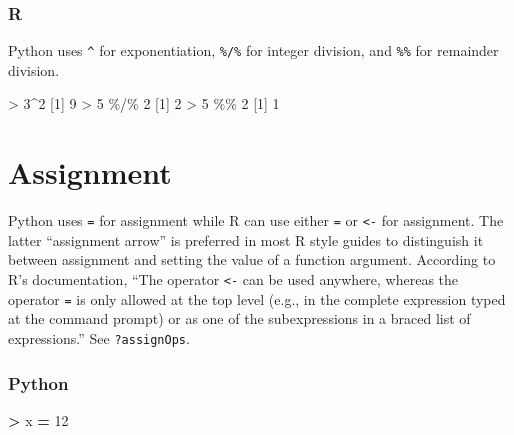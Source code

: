 \documentclass[
]{book}
\newenvironment{Shaded}{\begin{snugshade}}{\end{snugshade}}
\newcommand{\DecValTok}[1]{\textcolor[rgb]{0.00,0.00,0.81}{#1}}
\newcommand{\NormalTok}[1]{#1}
\newcommand{\OperatorTok}[1]{\textcolor[rgb]{0.81,0.36,0.00}{\textbf{#1}}}
\newcommand{\SpecialCharTok}[1]{\textcolor[rgb]{0.00,0.00,0.00}{#1}}
\begin{document}
\hypertarget{r}{%
\subsubsection*{R}\label{r}}

Python uses \texttt{\^{}} for exponentiation, \texttt{\%/\%} for integer division, and \texttt{\%\%} for remainder division.

\begin{Shaded}
\begin{Highlighting}[]
\SpecialCharTok{\textgreater{}} \DecValTok{3}\SpecialCharTok{\^{}}\DecValTok{2}
\NormalTok{[}\DecValTok{1}\NormalTok{] }\DecValTok{9}
\SpecialCharTok{\textgreater{}} \DecValTok{5} \SpecialCharTok{\%/\%} \DecValTok{2}
\NormalTok{[}\DecValTok{1}\NormalTok{] }\DecValTok{2}
\SpecialCharTok{\textgreater{}} \DecValTok{5} \SpecialCharTok{\%\%} \DecValTok{2}
\NormalTok{[}\DecValTok{1}\NormalTok{] }\DecValTok{1}
\end{Highlighting}
\end{Shaded}

\hypertarget{assignment}{%
\section{Assignment}\label{assignment}}

Python uses \texttt{=} for assignment while R can use either \texttt{=} or \texttt{\textless{}-} for assignment. The latter ``assignment arrow'' is preferred in most R style guides to distinguish it between assignment and setting the value of a function argument. According to R's documentation, ``The operator \texttt{\textless{}-} can be used anywhere, whereas the operator \texttt{=} is only allowed at the top level (e.g., in the complete expression typed at the command prompt) or as one of the subexpressions in a braced list of expressions.'' See \texttt{?assignOps}.

\hypertarget{python-1}{%
\subsubsection*{Python}\label{python-1}}

\begin{Shaded}
\begin{Highlighting}[]
\OperatorTok{\textgreater{}}\NormalTok{ x }\OperatorTok{=} \DecValTok{12}
\end{Highlighting}
\end{Shaded}
\end{document}
